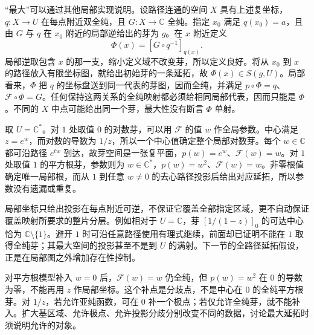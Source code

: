 \ProseParagraphBreak
“最大”可以通过其他局部实现说明。设路径连通的空间 \(X\) 具有上述复坐标，\(q:X\to U\) 在每点附近双全纯，且 \(G:X\to\mathbb C\) 全纯。指定 \(x_0\) 满足 \(q(x_0)=a\)，且由 \(G\) 与 \(q\) 在 \(x_0\) 附近的局部逆给出的芽为 \(g\)。在 \(x\) 附近定义
\[
 \Phi(x)=[G\circ q^{-1}]_{q(x)}.
\]
局部逆取包含 \(x\) 的那一支，缩小定义域不改变芽，所以定义良好。将从 \(x_0\) 到 \(x\) 的路径放入有限坐标图，就给出初始芽的一条延拓，故 \(\Phi(x)\in S(g,U)\)。局部看来，\(\Phi\) 把 \(q\) 的坐标盘送到同一代表的芽图，因而全纯，并满足 \(p\circ\Phi=q\)、\(\mathcal F\circ\Phi=G\)。任何保持这两关系的全纯映射都必须给相同局部代表，因而只能是 \(\Phi\)。不同的 \(X\) 中点可能给出同一个芽，最大性没有断言 \(\Phi\) 单射。

\ProseParagraphBreak
取 \(U=\mathbb C^*\)。对 \(1\) 处取值 \(0\) 的对数芽，可以用 \(\mathcal F\) 的值 \(w\) 作全局参数。中心满足 \(z=e^w\)，而对数的导数为 \(1/z\)，所以一个中心值确定整个局部对数芽。每个 \(w\in\mathbb C\) 都可沿路径 \(e^{tw}\) 到达，故芽空间是一张复平面，\(p(w)=e^w\)、\(\mathcal F(w)=w\)。对 \(1\) 处取值 \(1\) 的平方根芽，参数则为 \(w\in\mathbb C^*\)，\(p(w)=w^2\)、\(\mathcal F(w)=w\)。非零根值确定唯一局部根，而从 \(1\) 到任意 \(w\ne0\) 的去心路径投影后给出对应延拓，所以参数没有遗漏或重复。

\ProseParagraphBreak
局部坐标只给出投影在每点附近可逆，不保证它覆盖全部指定区域，更不自动保证覆盖映射所要求的整片分层。例如相对于 \(U=\mathbb C\)，芽 \([1/(1-z)]_0\) 的可达中心恰为 \(\mathbb C\setminus\{1\}\)。避开 \(1\) 时可沿任意路径使用有理式继续，前面却已证明不能在 \(1\) 取得全纯芽；其最大空间的投影甚至不是到 \(U\) 的满射。下一节的全路径延拓假设，正是在局部图之外增加存在性控制。

\ProseParagraphBreak
对平方根模型补入 \(w=0\) 后，\(\mathcal F(w)=w\) 仍全纯，但 \(p(w)=w^2\) 在 \(0\) 的导数为零，不能再用 \(z\) 作局部坐标。这个补点是分歧点，不是中心在 \(0\) 的全纯平方根芽。对 \(1/z\)，若允许亚纯函数，可在 \(0\) 补一个极点；若仅允许全纯芽，就不能补入。扩大基区域、允许极点、允许投影分歧分别改变不同的数据，讨论最大延拓时须说明允许的对象。
